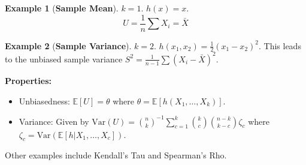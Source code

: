 \documentclass[12pt, a4paper]{article}
\theoremstyle{definition}
\newtheorem{example}{Example}
\newcommand{\E}{\mathbb{E}}
\newcommand{\Var}{\text{Var}}
\begin{document}
\begin{example}[\textbf{Sample Mean}]
$k=1$. $h(x) = x$.
$$ U = \frac{1}{n} \sum X_i = \bar{X} $$
\end{example}

\begin{example}[\textbf{Sample Variance}]
$k=2$. $h(x_1, x_2) = \frac{1}{2}(x_1 - x_2)^2$.
This leads to the unbiased sample variance $S^2 = \frac{1}{n-1} \sum (X_i - \bar{X})^2$.
\end{example}

\textbf{Properties:}
\begin{itemize}
    \item Unbiasedness: $\E[U] = \theta$ where $\theta = \E[h(X_1, \dots, X_k)]$.
    \item Variance: Given by $\Var(U) = \binom{n}{k}^{-1} \sum_{c=1}^k \binom{k}{c} \binom{n-k}{k-c} \zeta_c$ where $\zeta_c = \Var(\E[h | X_1, \dots, X_c])$.
\end{itemize}
Other examples include Kendall's Tau and Spearman's Rho.
\end{document}
